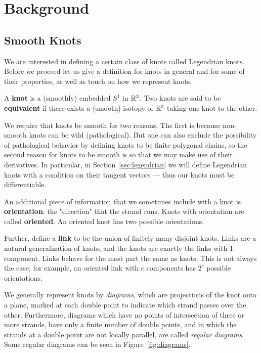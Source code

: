 \chapter{Background}\label{ch:background}
\section{Smooth Knots}\label{sec:knots}

We are interested in defining a certain class of knots called Legendrian knots. Before we proceed let us give a definition for knots in general and for some of their properties, as well as touch on how we represent knots. 

\begin{definition}\label{defn:knots}
    A \textbf{knot} is a (smoothly) embedded $S^1$ in $\mathbb{R}^3$. Two knots are said to be \textbf{equivalent} if there exists a (smooth) isotopy of $\mathbb{R}^3$ taking one knot to the other.
\end{definition}
We require that knots be smooth for two reasons. The first is because non-smooth knots can be wild (pathological). But one can also exclude the possibility of pathological behavior by defining knots to be finite polygonal chains, so the second reason for knots to be smooth is so that we may make use of their derivatives. In particular, in Section~\ref{sec:legendrian} we will define Legendrian knots with a condition on their tangent vectors --- thus our knots must be differentiable.

An additional piece of information that we sometimes include with a knot is \textbf{orientation}: the "direction" that the strand runs. Knots with orientation are called \textbf{oriented}. An oriented knot has two possible orientations.

Further, define a \textbf{link} to be the union of finitely many disjoint knots. Links are a natural generalization of knots, and the knots are exactly the links with 1 component. Links behave for the most part the same as knots. This is not always the case; for example, an oriented link with $c$ components has $2^c$ possible orientations.


We generally represent knots by \emph{diagrams}, which are projections of the knot onto a plane, marked at each double point to indicate which strand passes over the other.
Furthermore, diagrams which have no points of intersection of three or more strands, have only a finite number of double points, and in which the strands at a double point are not locally parallel, are called \emph{regular diagrams}. Some regular diagrams can be seen in Figure~\ref{fig:diagrams}.

